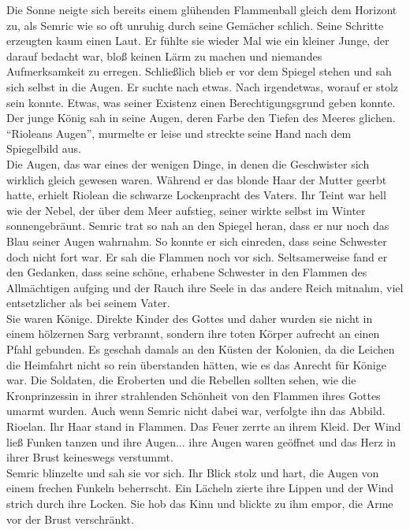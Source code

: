 Die Sonne neigte sich bereits einem glühenden Flammenball gleich dem Horizont zu, als Semric wie so 
oft unruhig durch seine Gemächer schlich. Seine Schritte erzeugten kaum einen Laut. Er fühlte sie 
wieder Mal wie ein kleiner Junge, der darauf bedacht war, bloß keinen Lärm zu machen und niemandes 
Aufmerksamkeit zu erregen. Schließlich blieb er vor dem Spiegel stehen und sah sich selbst in die 
Augen. Er suchte nach etwas. Nach irgendetwas, worauf er stolz sein konnte. Etwas, was seiner 
Existenz einen Berechtigungsgrund geben konnte. Der junge König sah in seine Augen, deren Farbe den 
Tiefen des Meeres glichen.\\
``Rioleans Augen'', murmelte er leise und streckte seine Hand nach dem Spiegelbild aus. \\
Die Augen, das war eines der wenigen Dinge, in denen die Geschwister sich wirklich gleich gewesen 
waren. Während er das blonde Haar der Mutter geerbt hatte, erhielt Riolean die schwarze 
Lockenpracht des Vaters. Ihr Teint war hell wie der Nebel, der über dem Meer aufstieg, seiner 
wirkte selbst im Winter sonnengebräunt. Semric trat so nah an den Spiegel heran, dass er nur noch 
das Blau seiner Augen wahrnahm. So konnte er sich einreden, dass seine Schwester doch nicht fort 
war. Er sah die Flammen noch vor sich. Seltsamerweise fand er den Gedanken, dass seine schöne, 
erhabene Schwester in den Flammen des Allmächtigen aufging und der Rauch ihre Seele in das andere 
Reich mitnahm, viel entsetzlicher als bei seinem Vater.\\
Sie waren Könige. Direkte Kinder des Gottes und daher wurden sie nicht in einem hölzernen Sarg 
verbrannt, sondern ihre toten Körper aufrecht an einen Pfahl gebunden. Es geschah damals an den 
Küsten der Kolonien, da die Leichen die Heimfahrt nicht so rein überstanden hätten, wie es das 
Anrecht für Könige war. Die Soldaten, die Eroberten und die Rebellen sollten sehen, wie die 
Kronprinzessin in ihrer strahlenden Schönheit von den Flammen ihres Gottes umarmt wurden. Auch wenn 
Semric nicht dabei war, verfolgte ihn das Abbild. Rioelan. Ihr Haar stand in Flammen. Das Feuer 
zerrte an ihrem Kleid. Der Wind ließ Funken tanzen und ihre Augen... ihre Augen waren geöffnet und 
das Herz in ihrer Brust keineswegs verstummt. \\
Semric blinzelte und sah sie vor sich. Ihr Blick stolz und hart, die Augen von einem frechen 
Funkeln beherrscht. Ein Lächeln zierte ihre Lippen und der Wind strich durch ihre Locken. Sie hob 
das Kinn und blickte zu ihm empor, die Arme vor der Brust verschränkt. \\
